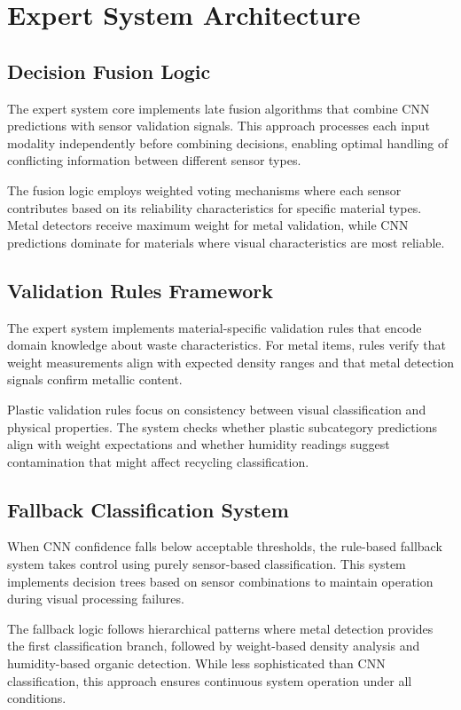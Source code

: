 \documentclass[11pt, a4paper]{article}
\begin{document}
\section{Expert System Architecture}

\subsection{Decision Fusion Logic}
The expert system core implements late fusion algorithms that combine CNN predictions with sensor validation signals. This approach processes each input modality independently before combining decisions, enabling optimal handling of conflicting information between different sensor types.

The fusion logic employs weighted voting mechanisms where each sensor contributes based on its reliability characteristics for specific material types. Metal detectors receive maximum weight for metal validation, while CNN predictions dominate for materials where visual characteristics are most reliable.

\subsection{Validation Rules Framework}
The expert system implements material-specific validation rules that encode domain knowledge about waste characteristics. For metal items, rules verify that weight measurements align with expected density ranges and that metal detection signals confirm metallic content.

Plastic validation rules focus on consistency between visual classification and physical properties. The system checks whether plastic subcategory predictions align with weight expectations and whether humidity readings suggest contamination that might affect recycling classification.

\subsection{Fallback Classification System}
When CNN confidence falls below acceptable thresholds, the rule-based fallback system takes control using purely sensor-based classification. This system implements decision trees based on sensor combinations to maintain operation during visual processing failures.

The fallback logic follows hierarchical patterns where metal detection provides the first classification branch, followed by weight-based density analysis and humidity-based organic detection. While less sophisticated than CNN classification, this approach ensures continuous system operation under all conditions.
\end{document}
